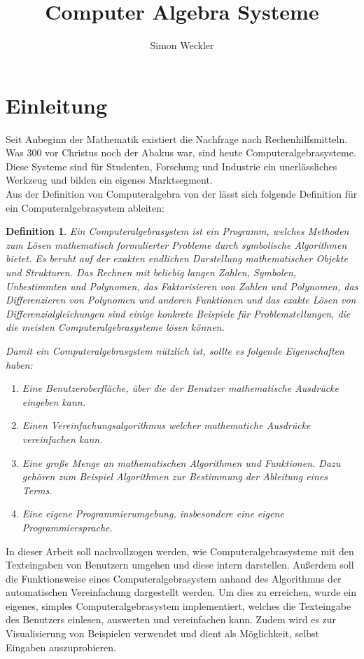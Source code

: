 \documentclass[11pt]{article}
\title{Computer Algebra Systeme}
\author{Simon Weckler}
\newtheorem{defin}{Definition}
\begin{document}
\maketitle
\tableofcontents

\section{Einleitung}

Seit Anbeginn der Mathematik existiert  die Nachfrage nach Rechenhilfsmitteln.
Was 300 vor Christus noch der Abakus war, sind heute Computeralgebrasysteme.
Diese Systeme sind für Studenten, Forschung und Industrie ein unerlässliches Werkzeug
und bilden ein eigenes Marktsegment.\\

Aus der Definition von Computeralgebra von der \citeauthor{CA} \cite{CA}
lässt sich folgende Definition für ein Computeralgebrasystem ableiten:
\begin{defin}
\label{def:cas}
Ein Computeralgebrasystem ist ein Programm, welches Methoden zum Lösen mathematisch
formulierter Probleme durch symbolische Algorithmen bietet. Es beruht auf der exakten
endlichen Darstellung mathematischer Objekte und Strukturen.
Das Rechnen mit beliebig langen Zahlen, Symbolen, Unbestimmten und Polynomen, 
das Faktorisieren von Zahlen und Polynomen, das Differenzieren von Polynomen und 
anderen Funktionen und das exakte Lösen von Differenzialgleichungen 
sind einige konkrete Beispiele für Problemstellungen, die die meisten Computeralgebrasysteme
lösen können.

Damit ein Computeralgebrasystem nützlich ist, sollte es folgende Eigenschaften haben:
\begin{enumerate}
  \item Eine Benutzeroberfläche, über die der Benutzer mathematische Ausdrücke eingeben kann.
  \item Einen Vereinfachungsalgorithmus welcher mathematiche Ausdrücke vereinfachen kann.
  \item Eine große Menge an mathematischen Algorithmen und Funktionen. Dazu gehören zum Beispiel
        Algorithmen zur Bestimmung der Ableitung eines Terms.
  \item Eine eigene Programmierumgebung, insbesondere eine eigene Programmiersprache.
\end{enumerate}

\end{defin}

In dieser Arbeit soll nachvollzogen werden, wie Computeralgebrasysteme mit den Texteingaben von Benutzern 
umgehen und diese intern darstellen. Außerdem soll die Funktionsweise eines Computeralgebrasystem 
anhand des Algorithmus der automatischen Vereinfachung dargestellt werden.
Um dies zu erreichen, wurde ein eigenes, simples Computeralgebrasystem implementiert,
welches die Texteingabe des Benutzers einlesen, auswerten und vereinfachen kann. 
Zudem wird es zur Visualisierung von Beispielen verwendet und dient als Möglichkeit, 
selbst Eingaben auszuprobieren. 
\end{document}
